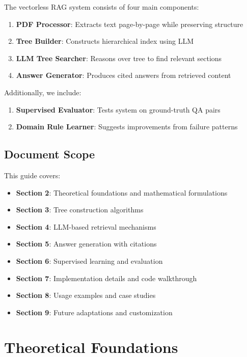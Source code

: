 \documentclass[12pt,a4paper]{article}
\begin{document}
The vectorless RAG system consists of four main components:

\begin{enumerate}
    \item \textbf{PDF Processor}: Extracts text page-by-page while preserving structure
    \item \textbf{Tree Builder}: Constructs hierarchical index using LLM
    \item \textbf{LLM Tree Searcher}: Reasons over tree to find relevant sections
    \item \textbf{Answer Generator}: Produces cited answers from retrieved content
\end{enumerate}

Additionally, we include:

\begin{enumerate}[resume]
    \item \textbf{Supervised Evaluator}: Tests system on ground-truth QA pairs
    \item \textbf{Domain Rule Learner}: Suggests improvements from failure patterns
\end{enumerate}

\subsection{Document Scope}

This guide covers:

\begin{itemize}
    \item \textbf{Section 2}: Theoretical foundations and mathematical formulations
    \item \textbf{Section 3}: Tree construction algorithms
    \item \textbf{Section 4}: LLM-based retrieval mechanisms
    \item \textbf{Section 5}: Answer generation with citations
    \item \textbf{Section 6}: Supervised learning and evaluation
    \item \textbf{Section 7}: Implementation details and code walkthrough
    \item \textbf{Section 8}: Usage examples and case studies
    \item \textbf{Section 9}: Future adaptations and customization
\end{itemize}

\section{Theoretical Foundations}
\end{document}
